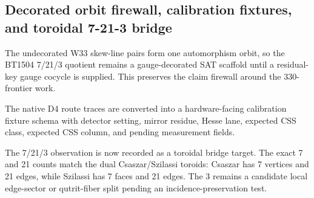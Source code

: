 \subsection{Decorated orbit firewall, calibration fixtures, and toroidal 7-21-3 bridge}
\label{sec:bt1510-bt1513-orbit-fixture-toroid}

The undecorated W33 skew-line pairs form one automorphism orbit, so the BT1504 7/21/3 quotient remains a gauge-decorated SAT scaffold until a residual-key gauge cocycle is supplied.  This preserves the claim firewall around the 330-frontier work.

The native D4 route traces are converted into a hardware-facing calibration fixture schema with detector setting, mirror residue, Hesse lane, expected CSS class, expected CSS column, and pending measurement fields.

The 7/21/3 observation is now recorded as a toroidal bridge target.  The exact 7 and 21 counts match the dual Csaszar/Szilassi toroids: Csaszar has 7 vertices and 21 edges, while Szilassi has 7 faces and 21 edges.  The 3 remains a candidate local edge-sector or qutrit-fiber split pending an incidence-preservation test.
